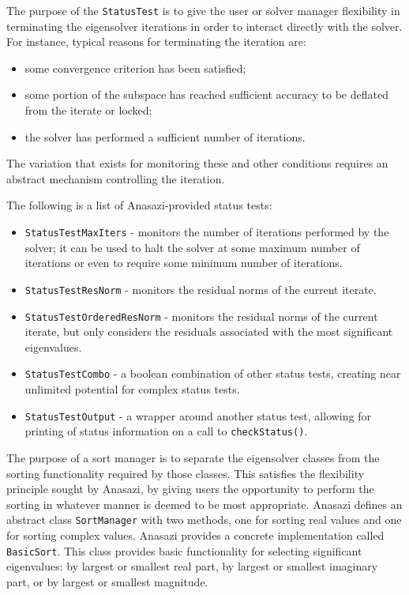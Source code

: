 \documentclass[acmtoms]{acmtrans2m}
\newcommand{\aspace}[1]{\texttt{#1}}
\begin{document}
The purpose of the \aspace{StatusTest} is to give the user or solver
manager flexibility in terminating the eigensolver iterations in
order to interact directly with the solver. For instance, typical
reasons for terminating the iteration are:
\begin{itemize}
  \item some convergence criterion has been satisfied;
  \item some portion of the subspace has reached sufficient accuracy to be
  deflated from the iterate or locked;
  \item the solver has performed a sufficient number of iterations.
\end{itemize}
The variation that exists for monitoring these and other conditions requires an abstract mechanism
controlling the iteration.

The following is a list of Anasazi-provided status tests:
\begin{itemize}
  \item \aspace{StatusTestMaxIters} - monitors the number of iterations
    performed by the solver; it can be used to halt the solver at some maximum number of iterations
    or even to require some minimum number of iterations.
  \item \aspace{StatusTestResNorm} - monitors the residual norms of the
    current iterate.
  \item \aspace{StatusTestOrderedResNorm} - monitors the residual
    norms of the current iterate, but only considers the residuals associated with the
    most significant eigenvalues.
  \item \aspace{StatusTestCombo} - a boolean combination of
    other status tests, creating near unlimited potential for complex status tests.
  \item \aspace{StatusTestOutput} - a wrapper around another
    status test, allowing for printing of status information on a call to
    \verb!checkStatus()!.
\end{itemize}

The purpose of a sort manager is to separate the eigensolver classes from the sorting
functionality required by those classes. This satisfies the flexibility principle sought
by Anasazi, by giving users the opportunity to perform the sorting in whatever manner is
deemed to be most appropriate. Anasazi defines an abstract class \aspace{SortManager} with
two methods, one for sorting real values and one for sorting complex values.  Anasazi
provides a concrete implementation called \aspace{BasicSort}.  This class provides basic
functionality for selecting significant eigenvalues: by largest or smallest real part, by
largest or smallest imaginary part, or by largest or smallest magnitude.
\end{document}
